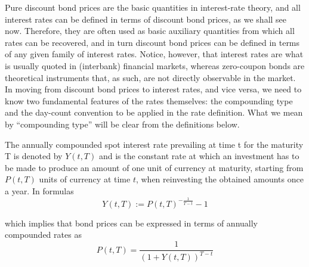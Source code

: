  Pure discount bond prices are the basic quantities in interest-rate
 theory, and all interest rates can be defined in terms of
 discount bond prices, as we shall see now. Therefore, they are
 often used as basic auxiliary quantities from which all rates can be
 recovered, and in turn discount bond prices can be defined in
 terms of any given family of interest rates. Notice, however, that
 interest rates are what is usually quoted in (interbank) financial
 markets, whereas zero-coupon bonds are theoretical instruments that,
 as such, are not directly observable in the market. 
In moving from discount bond prices to interest rates, and vice versa,
we need to know two fundamental features of the rates themselves: the
compounding type and the day-count convention to be applied in the
rate definition. What we mean by ``compounding type'' will be clear
from the definitions below.

\begin{defn} 
The annually compounded spot interest rate prevailing at time t for
the maturity T is denoted by $Y(t,T)$ and is the constant rate at
which an investment has to be made to produce an amount of one unit of
currency at maturity, starting from $P(t,T)$ units of currency at time
$t$, when reinvesting the obtained amounts once a year. In formulas
\begin{equation}
\label{eq:ACRateDef}
Y(t,T):=P(t,T)^{-\frac{1}{T-t}}-1
\end{equation}
\end{defn}
which implies that bond prices can be expressed in terms of
annually compounded rates as
\begin{equation}
\label{eq:ZCfromACRate}
P(t,T)= \frac{1}{(1+Y(t,T))^{T-t}}
\end{equation}


